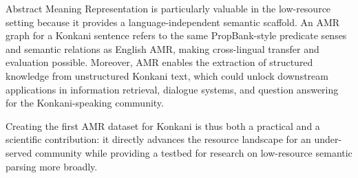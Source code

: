 Abstract Meaning Representation is particularly valuable in the low-resource setting because it provides a language-independent semantic scaffold. An AMR graph for a Konkani sentence refers to the same PropBank-style predicate senses and semantic relations as English AMR, making cross-lingual transfer and evaluation possible. Moreover, AMR enables the extraction of structured knowledge from unstructured Konkani text, which could unlock downstream applications in information retrieval, dialogue systems, and question answering for the Konkani-speaking community.

Creating the first AMR dataset for Konkani is thus both a practical and a scientific contribution: it directly advances the resource landscape for an under-served community while providing a testbed for research on low-resource semantic parsing more broadly.
